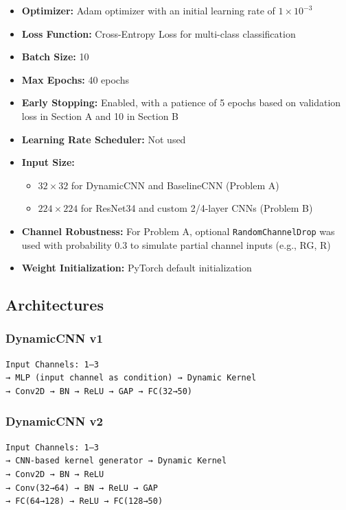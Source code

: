 \documentclass[12pt]{article}
\begin{document}
\begin{itemize}
    \item \textbf{Optimizer:} Adam optimizer with an initial learning rate of $1 \times 10^{-3}$
    \item \textbf{Loss Function:} Cross-Entropy Loss for multi-class classification
    \item \textbf{Batch Size:} 10
    \item \textbf{Max Epochs:} 40 epochs
    \item \textbf{Early Stopping:} Enabled, with a patience of 5 epochs based on validation loss in Section A and 10 in Section B
    \item \textbf{Learning Rate Scheduler:} Not used
    \item \textbf{Input Size:}
    \begin{itemize}
        \item $32 \times 32$ for DynamicCNN and BaselineCNN (Problem A)
        \item $224 \times 224$ for ResNet34 and custom 2/4-layer CNNs (Problem B)
    \end{itemize}
    \item \textbf{Channel Robustness:} For Problem A, optional \texttt{RandomChannelDrop} was used with probability 0.3 to simulate partial channel inputs (e.g., RG, R)
    \item \textbf{Weight Initialization:} PyTorch default initialization
\end{itemize}

\subsection*{Architectures}

\subsubsection*{DynamicCNN v1}
\begin{Verbatim}
Input Channels: 1–3
→ MLP (input channel as condition) → Dynamic Kernel
→ Conv2D → BN → ReLU → GAP → FC(32→50)
\end{Verbatim}

\subsubsection*{DynamicCNN v2}
\begin{Verbatim}
Input Channels: 1–3
→ CNN-based kernel generator → Dynamic Kernel
→ Conv2D → BN → ReLU 
→ Conv(32→64) → BN → ReLU → GAP 
→ FC(64→128) → ReLU → FC(128→50)
\end{Verbatim}
\end{document}
